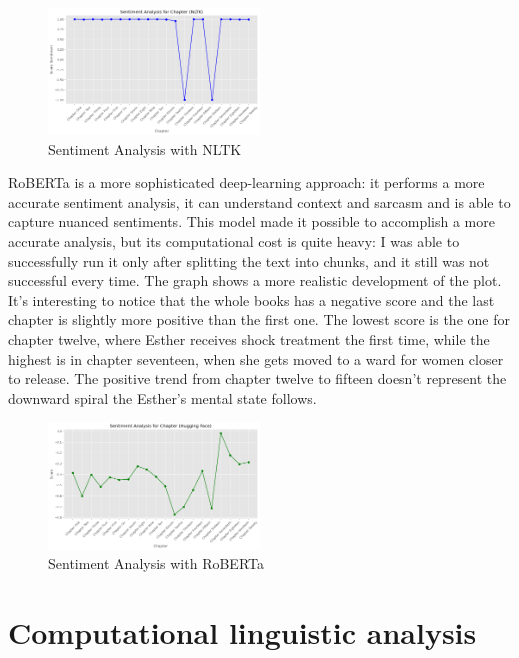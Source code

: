 \documentclass[11pt]{article}
\begin{document}
\begin{figure}[h]
    \centering
    \includegraphics[width=0.5\textwidth]{graph/nltksent.png}
    \caption{Sentiment Analysis with NLTK}
    \label{fig:example}
\end{figure}


RoBERTa is a more sophisticated deep-learning approach: it performs a more accurate sentiment analysis, it can understand context and sarcasm and is able to capture nuanced sentiments. This model made it possible to accomplish a more accurate analysis, but its computational cost is quite heavy: I was able to successfully run it only after splitting the text into chunks, and it still was not successful every time.
The graph shows a more realistic development of the plot. It’s interesting to notice that the whole books has a negative score and the last chapter is slightly more positive than the first one. The lowest score is the one for chapter twelve, where Esther receives shock treatment the first time, while the highest is in chapter seventeen, when she gets moved to a ward for women closer to release. The positive trend from chapter twelve to fifteen doesn’t represent the downward spiral the Esther’s mental state follows.

\begin{figure}[h]
    \centering
    \includegraphics[width=0.5\textwidth]{graph/hugsent.png}
    \caption{Sentiment Analysis with RoBERTa}
    \label{fig:example}
\end{figure}

\section{Computational linguistic analysis}
\end{document}
